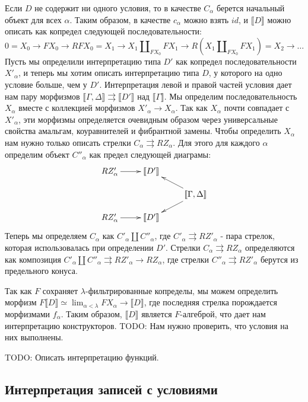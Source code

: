 \documentclass{amsart}
\theoremstyle{definition}
\theoremstyle{remark}
\renewcommand{\ll}{\llbracket}
\newcommand{\rr}{\rrbracket}
\numberwithin{figure}{section}
\begin{document}
Если $D$ не содержит ни одного условия, то в качестве $C_\alpha$ берется начальный объект для всех $\alpha$.
Таким образом, в качестве $c_\alpha$ можно взять $id$, и $\ll D \rr$ можно описать как копредел следующей последовательности:
\[ 0 = X_0 \to F X_0 \to R F X_0 = X_1 \to X_1 \amalg_{F X_0} F X_1 \to R (X_1 \amalg_{F X_0} F X_1) = X_2 \to \ldots \]
Пусть мы определили интерпретацию типа $D'$ как копредел последовательности $X'_\alpha$, и теперь мы хотим описать интерпретацию типа $D$, у которого на одно условие больше, чем у $D'$.
Интерпретация левой и правой частей условия дает нам пару морфизмов $\ll \Gamma, \Delta \rr \rightrightarrows \ll D' \rr$ над $\ll \Gamma \rr$.
Мы определим последовательность $X_\alpha$ вместе с коллекцией морфизмов $X'_\alpha \to X_\alpha$.
Так как $X_\alpha$ почти совпадает с $X'_\alpha$, эти морфизмы определяется очевидным образом через универсальные свойства амальгам, коуравнителей и фибрантной замены.
Чтобы определить $X_\alpha$ нам нужно только описать стрелки $C_\alpha \rightrightarrows R Z_\alpha$.
Для этого для каждого $\alpha$ определим объект $C''_\alpha$ как предел следующей диаграмы:
\[ \xymatrix@R-1pc{ R Z'_\alpha \ar[r] & \ll D' \rr & \\
                                       &            & \ll \Gamma, \Delta \rr \ar[ul] \ar[dl] \\
                    R Z'_\alpha \ar[r] & \ll D' \rr &
            } \]
Теперь мы определяем $C_\alpha$ как $C'_\alpha \amalg C''_\alpha$, где $C'_\alpha \rightrightarrows R Z'_\alpha$ - пара стрелок, которая использовалась при определении $D'$.
Стрелки $C_\alpha \rightrightarrows R Z_\alpha$ определяются как композиция $C'_\alpha \amalg C''_\alpha \rightrightarrows R Z'_\alpha \to R Z_\alpha$,
    где стрелки $C''_\alpha \rightrightarrows R Z'_\alpha$ берутся из предельного конуса.

Так как $F$ сохраняет $\lambda$-фильтрированные копределы, мы можем определить морфизм $F \ll D \rr \simeq \lim_{\alpha < \lambda} F X_\alpha \to \ll D \rr$,
    где последняя стрелка порождается морфизмами $f_\alpha$.
Таким образом, $\ll D \rr$ является $F$-алгеброй, что дает нам интерпретацию конструкторов.
TODO: Нам нужно проверить, что условия на них выполнены.

TODO: Описать интерпретацию функций.

\subsection{Интерпретация записей с условиями}



\end{document}
